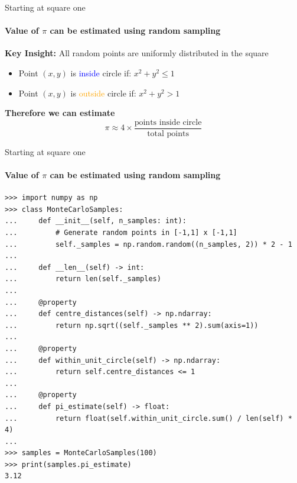 \documentclass{beamer}
\begin{document}
\begin{frame}{Starting at square one}
  \framesubtitle{Value of $\pi$ can be estimated using random sampling}
  \textbf{Key Insight:} All random points are uniformly distributed in the square

  \begin{itemize}
    \item Point $(x,y)$ is \textcolor{blue}{inside} circle if: $x^2 + y^2 \leq 1$
    \item Point $(x,y)$ is \textcolor{orange}{outside} circle if: $x^2 + y^2 > 1$
  \end{itemize}
  
  \vspace{0.5cm}
  \textbf{Therefore we can estimate}
  $$\pi \approx 4 \times \frac{\text{points inside circle}}{\text{total points}}$$
\end{frame}

\begin{frame}[fragile]{Starting at square one}
  \framesubtitle{Value of $\pi$ can be estimated using random sampling}
\begin{lstlisting}
>>> import numpy as np
>>> class MonteCarloSamples:
...     def __init__(self, n_samples: int):
...         # Generate random points in [-1,1] x [-1,1]
...         self._samples = np.random.random((n_samples, 2)) * 2 - 1
...
...     def __len__(self) -> int:
...         return len(self._samples)
...
...     @property
...     def centre_distances(self) -> np.ndarray:
...         return np.sqrt((self._samples ** 2).sum(axis=1))
...     
...     @property
...     def within_unit_circle(self) -> np.ndarray:
...         return self.centre_distances <= 1
...     
...     @property
...     def pi_estimate(self) -> float:
...         return float(self.within_unit_circle.sum() / len(self) * 4)
...
>>> samples = MonteCarloSamples(100)
>>> print(samples.pi_estimate)
3.12
\end{lstlisting}
\end{frame}
\end{document}
